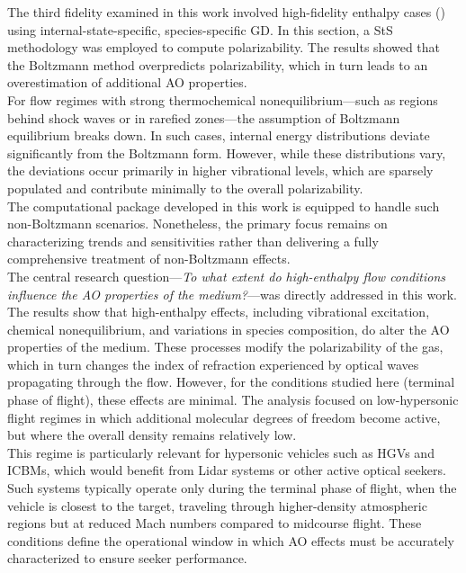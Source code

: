 The third fidelity examined in this work involved high-fidelity enthalpy cases
() using internal-state-specific, species-specific
\gls{GD}. In this section, a \gls{StS} methodology was employed to compute
polarizability. The results showed that the Boltzmann method overpredicts
polarizability, which in turn leads to an overestimation of additional \gls{AO}
properties.\\

For flow regimes with strong thermochemical nonequilibrium—such as regions
behind shock waves or in rarefied zones—the assumption of Boltzmann
equilibrium breaks down. In such cases, internal energy distributions deviate
significantly from the Boltzmann form. However, while these distributions vary,
the deviations occur primarily in higher vibrational levels, which are sparsely
populated and contribute minimally to the overall polarizability. \\

The computational package developed in this work is equipped to handle such
non-Boltzmann scenarios. Nonetheless, the primary focus remains on
characterizing trends and sensitivities rather than delivering a fully
comprehensive treatment of non-Boltzmann effects.  \\

The central research question—\textit{To what extent do high-enthalpy flow
conditions influence the \gls{AO} properties of the medium?}—was directly
addressed in this work. The results show that high-enthalpy effects, including
vibrational excitation, chemical nonequilibrium, and variations in species
composition, do alter the \gls{AO} properties of the medium. These processes
modify the polarizability of the gas, which in turn changes the index of
refraction experienced by optical waves propagating through the flow. However,
for the conditions studied here (terminal phase of flight), these effects are minimal. The analysis
focused on low-hypersonic flight regimes in which additional molecular degrees
of freedom become active, but where the overall density remains relatively low.
\\

This regime is particularly relevant for hypersonic vehicles such as
\glspl{HGV} and \glspl{ICBM}, which would benefit from \gls{Lidar} systems or
other active optical seekers. Such systems typically operate only during the
terminal phase of flight, when the vehicle is closest to the target, traveling
through higher-density atmospheric regions but at reduced Mach numbers compared
to midcourse flight. These conditions define the operational window in which
\gls{AO} effects must be accurately characterized to ensure seeker
performance.\\


